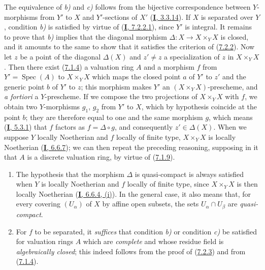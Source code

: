The equivalence of \emph{b)} and \emph{c)} follows from the bijective correspondence between
$Y$-morphisms from $Y'$ to $X$ and $Y'$-sections of $X'$
(\hyperref[I.3.3.14]{\textbf{I}, 3.3.14}). If $X$ is separated over $Y$, condition \emph{b)}
is satisfied by virtue of (\hyperref[I.7.2.2.1]{\textbf{I}, 7.2.2.1}), since $Y'$
is integral. It remains to prove that \emph{b)} implies that the diagonal morphism
$\Delta:X\to X\times_YX$ is closed, and it amounts to the same to show that it
satisfies the criterion of (\hyperref[II.7.2.2]{7.2.2}). Now let $z$ be a
point of the diagonal $\Delta(X)$ and $z'\neq z$ a specialization of $z$ in
$X\times_YX$. Then there exist (\hyperref[II.7.1.4]{7.1.4}) a
valuation ring $A$ and a morphism $f$ from $Y'=\operatorname{Spec}(A)$ to
$X\times_YX$ which maps the closed point $a$ of $Y'$ to $z'$ and the generic
point $b$ of $Y'$ to $z$; this morphism makes $Y'$ an
$(X\times_YX)$-prescheme, and \emph{a fortiori} a $Y$-prescheme. If we compose
the two projections of $X\times_YX$ with $f$, we obtain two $Y$-morphisms
$g_1$, $g_2$ from $Y'$ to $X$, which by hypothesis coincide at the point $b$;
they are therefore equal to one and the same morphism $g$, which means
(\hyperref[I.5.3.1]{\textbf{I}, 5.3.1}) that $f$ factors as $f=\Delta\circ g$, and
consequently $z'\in\Delta(X)$. When we suppose $Y$ locally Noetherian and $f$
locally of finite type, $X\times_YX$ is locally Noetherian
(\hyperref[I.6.6.7]{\textbf{I}, 6.6.7}); we can then repeat the preceding
reasoning, supposing in it that $A$ is a discrete valuation ring, by virtue
of (\hyperref[II.7.1.9]{7.1.9}).

\begin{remark}[7.2.4]
\label{II.7.2.4}
\begin{enumerate}
\item[\rm (i)] The hypothesis that the morphism $\Delta$ is quasi-compact is
always satisfied when $Y$ is locally Noetherian and $f$ locally of
finite type, since $X\times_YX$ is then locally Noetherian
(\hyperref[I.6.6.4]{\textbf{I}, 6.6.4, (i)}). In the general case, it also means
that, for every covering $(U_\alpha)$ of $X$ by affine open subsets, the
sets $U_\alpha\cap U_\beta$ are \emph{quasi-compact}.
\item[\rm (ii)] For $f$ to be separated, it \emph{suffices} that condition \emph{b)}
or condition \emph{c)} be satisfied for valuation rings $A$ which are
\emph{complete} and whose residue field is \emph{algebraically closed};
this indeed follows from the proof of
(\hyperref[II.7.2.3]{7.2.3}) and from
(\hyperref[II.7.1.4]{7.1.4}).
\end{enumerate}
\end{remark}

